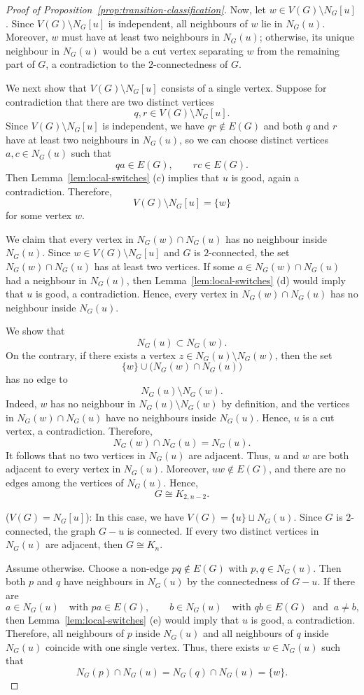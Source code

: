 \documentclass[11pt,a4paper]{amsart}
\theoremstyle{definition}
\theoremstyle{remark}
\begin{document}
{\begin{proof}[Proof of Proposition~\ref{prop:transition-classification}]
Now, let $w\in V(G)\setminus N_G[u]$. Since $V(G)\setminus N_G[u]$ is independent, all neighbours of $w$ lie in $N_G(u)$. 
Moreover, $w$ must have at least two neighbours in $N_G(u)$; otherwise, its unique neighbour in $N_G(u)$ would be a cut vertex separating $w$ from the remaining part of $G$, 
a contradiction to the $2$-connectedness of $G$. 

We next show that $V(G)\setminus N_G[u]$ consists of a single vertex. 
Suppose for contradiction that there are two distinct vertices \[q,r\in V(G)\setminus N_G[u].\] 
Since $V(G)\setminus N_G[u]$ is independent, we have $qr\notin E(G)$ and both $q$ and $r$ have at least two neighbours in $N_G(u)$, 
so we can choose distinct vertices $a,c\in N_G(u)$ such that \[qa\in E(G),\qquad rc\in E(G).\]
Then Lemma~\ref{lem:local-switches} (c) implies that $u$ is good, again a contradiction. Therefore, \[V(G)\setminus N_G[u]=\{w\}\] 
for some vertex $w$. 

We claim that every vertex in $N_G(w)\cap N_G(u)$ has no neighbour inside $N_G(u)$. 
Since $w\in V(G)\setminus N_G[u]$ and $G$ is $2$-connected, the set $N_G(w)\cap N_G(u)$ has at least two vertices. 
If some $a\in N_G(w)\cap N_G(u)$ had a neighbour in $N_G(u)$, then Lemma~\ref{lem:local-switches} (d) would imply that $u$ is good, a contradiction. 
Hence, every vertex in $N_G(w)\cap N_G(u)$ has no neighbour inside $N_G(u)$. 

We show that \[N_G(u) \subset N_G(w).\] 
On the contrary, if there exists a vertex $z\in N_G(u)\setminus N_G(w)$, then the set
\[\{w\}\cup \bigl(N_G(w)\cap N_G(u)\bigr)\] has no edge to \[N_G(u)\setminus N_G(w).\]
Indeed, $w$ has no neighbour in $N_G(u)\setminus N_G(w)$ by definition, and the vertices in $N_G(w)\cap N_G(u)$ have no neighbours inside $N_G(u)$. 
Hence, $u$ is a cut vertex, a contradiction. Therefore, \[N_G(w)\cap N_G(u)=N_G(u).\]
It follows that no two vertices in $N_G(u)$ are adjacent. Thus, $u$ and $w$ are both adjacent to every vertex in $N_G(u)$. Moreover, $uw\notin E(G)$, 
and there are no edges among the vertices of $N_G(u)$. Hence, \[G\cong K_{2,n-2}.\]

\medskip

\noindent
($V(G) = N_G[u]$): In this case, we have $V(G)=\{u\}\sqcup N_G(u)$. 
Since $G$ is $2$-connected, the graph $G - u$ is connected. 
If every two distinct vertices in $N_G(u)$ are adjacent, then $G\cong K_n$. 

Assume otherwise. Choose a non-edge $pq\notin E(G)$ with $p,q\in N_G(u)$. 
Then both $p$ and $q$ have neighbours in $N_G(u)$ by the connectedness of $G - u$. 
If there are \[a\in N_G(u)\quad\text{with }pa\in E(G),\qquad b\in N_G(u)\quad\text{with }qb\in E(G) \;\;\text{and}\;\; a\ne b, \]
then Lemma~\ref{lem:local-switches} (e) would imply that $u$ is good, a contradiction. 
Therefore, all neighbours of $p$ inside $N_G(u)$ and all neighbours of $q$ inside $N_G(u)$ coincide with one single vertex. 
Thus, there exists $w\in N_G(u)$ such that \[N_G(p)\cap N_G(u)=N_G(q)\cap N_G(u)=\{w\}.\]


\end{proof}}
\end{document}
